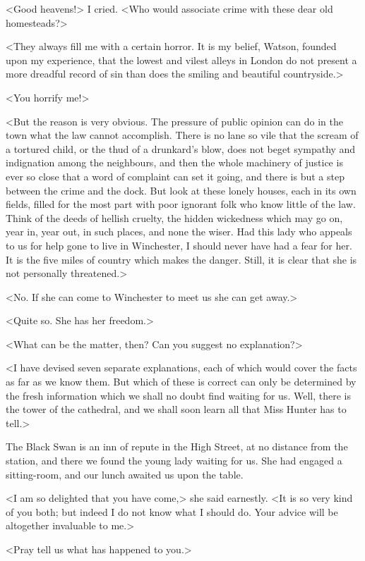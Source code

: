 <Good heavens!> I cried. <Who would associate crime with these dear old homesteads?>

<They always fill me with a certain horror. It is my belief, Watson, founded upon my experience, that the lowest and vilest alleys in London do not present a more dreadful record of sin than does the smiling and beautiful countryside.>

<You horrify me!>

<But the reason is very obvious. The pressure of public opinion can do in the town what the law cannot accomplish. There is no lane so vile that the scream of a tortured child, or the thud of a drunkard's blow, does not beget sympathy and indignation among the neighbours, and then the whole machinery of justice is ever so close that a word of complaint can set it going, and there is but a step between the crime and the dock. But look at these lonely houses, each in its own fields, filled for the most part with poor ignorant folk who know little of the law. Think of the deeds of hellish cruelty, the hidden wickedness which may go on, year in, year out, in such places, and none the wiser. Had this lady who appeals to us for help gone to live in Winchester, I should never have had a fear for her. It is the five miles of country which makes the danger. Still, it is clear that she is not personally threatened.>

<No. If she can come to Winchester to meet us she can get away.>

<Quite so. She has her freedom.>

<What can be the matter, then? Can you suggest no explanation?>

<I have devised seven separate explanations, each of which would cover the facts as far as we know them. But which of these is correct can only be determined by the fresh information which we shall no doubt find waiting for us. Well, there is the tower of the cathedral, and we shall soon learn all that Miss Hunter has to tell.>

The Black Swan is an inn of repute in the High Street, at no distance from the station, and there we found the young lady waiting for us. She had engaged a sitting-room, and our lunch awaited us upon the table.

<I am so delighted that you have come,> she said earnestly. <It is so very kind of you both; but indeed I do not know what I should do. Your advice will be altogether invaluable to me.>

<Pray tell us what has happened to you.>

